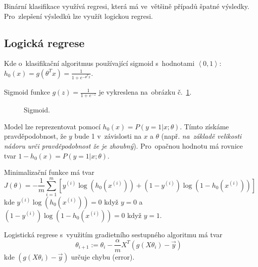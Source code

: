 Binární klasifikace využívá regresi, která má ve~většině případů špatné výsledky.
Pro~zlepšení výsledků lze využít logickou regresi.

\subsection{Logická regrese}

Kde o~klasifikační algoritmus používající sigmoid s~hodnotami $\left<0, 1\right>$:
$h_0(x) = g(\theta^T x) = \frac{1}{1+e^{-\theta^T x}}$.

Sigmoid funkce $g(z) = \frac{1}{1+e^{-z}}$ je vykreslena na~obrázku č.~\ref{logisticka-regrese-sigmoid}.

\begin{figure}[ht]
    \onehalfspacing
    \centering
    \caption{Sigmoid.}
    \label{logisticka-regrese-sigmoid}
\end{figure}

Model lze reprezentovat pomocí $h_0(x) = P(y = 1 | x ; \theta)$. 
Tímto získáme pravděpodobnost, že $y$ bude 1 v~závislosti na $x$ a $\theta$
(např. \emph{na~základě velikosti nádoru urči pravděpodobnost že je zhoubný}).
Pro~opačnou hodnotu má rovnice tvar $1 - h_0(x) = P(y = 1 | x ; \theta)$.

Minimalizační funkce má tvar 
$$
J(\theta) = -\frac{1}{m} \sum_{i=1}^{m} \left[ y^{(i)}\log(h_0(x^{(i)})) + (1-y^{(i)})\log(1 - h_0(x^{(i)})) \right]
$$
kde $y^{(i)}\log(h_0(x^{(i)})) = 0$ když $y = 0$ a $(1-y^{(i)})\log(1 - h_0(x^{(i)})) = 0$ když $y = 1$.

Logistická regrese s~využitím gradietního sestupného algoritmu má tvar 
$$
\theta_{i+1} := \theta_i - \frac{\alpha}{m} X^T(g(X\theta_i) - \vec{y})
$$
kde $(g(X\theta_i) - \vec{y})$ určuje chybu (error).

